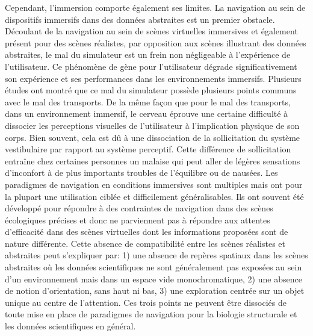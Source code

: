 Cependant, l'immersion comporte également ses limites. La navigation au sein de dispositifs immersifs dans des données abstraites est un premier obstacle. Découlant de la navigation au sein de scènes virtuelles immersives et également présent pour des scènes réalistes, par opposition aux scènes illustrant des données abstraites, le mal du simulateur est un frein non négligeable à l'expérience de l'utilisateur. Ce phénomène de gène pour l'utilisateur dégrade significativement son expérience et ses performances dans les environnements immersifs. Plusieurs études ont montré que ce mal du simulateur possède plusieurs points communs avec le mal des transports. De la même façon que pour le mal des transports, dans un environnement immersif, le cerveau éprouve une certaine difficulté à dissocier les perceptions visuelles de l'utilisateur à l'implication physique de son corps. Bien souvent, cela est dû à une dissociation de la sollicitation du système vestibulaire par rapport au système perceptif. Cette différence de sollicitation entraîne chez certaines personnes un malaise qui peut aller de légères sensations d'inconfort à de plus importants troubles de l'équilibre ou de nausées. Les paradigmes de navigation en conditions immersives sont multiples mais ont pour la plupart une utilisation ciblée et difficilement généralisables. Ils ont souvent été développé pour répondre à des contraintes de navigation dans des scènes écologiques précises et donc ne parviennent pas à répondre aux attentes d'efficacité dans des scènes virtuelles dont les informations proposées sont de nature différente. Cette absence de compatibilité entre les scènes réalistes et abstraites peut s'expliquer par: 1) une absence de repères spatiaux dans les scènes abstraites où les données scientifiques ne sont généralement pas exposées au sein d'un environnement mais dans un espace vide monochromatique, 2) une absence de notion d'orientation, sans haut ni bas, 3) une exploration centrée sur un objet unique au centre de l'attention. Ces trois points ne peuvent être dissociés de toute mise en place de paradigmes de navigation pour la biologie structurale et les données scientifiques en général.


